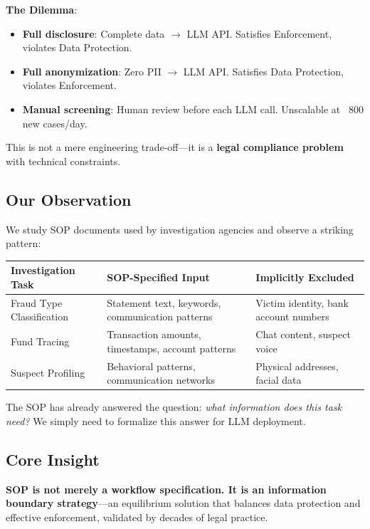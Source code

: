 \documentclass[letterpaper]{article}
\begin{document}
\textbf{The Dilemma}:
\begin{itemize}
    \item \textbf{Full disclosure}: Complete data $\rightarrow$ LLM API. Satisfies Enforcement, violates Data Protection.
    \item \textbf{Full anonymization}: Zero PII $\rightarrow$ LLM API. Satisfies Data Protection, violates Enforcement.
    \item \textbf{Manual screening}: Human review before each LLM call. Unscalable at ~800 new cases/day.
\end{itemize}

This is not a mere engineering trade-off---it is a \textbf{legal compliance problem} with technical constraints.

\subsection{Our Observation}

We study SOP documents used by investigation agencies and observe a striking pattern:

\begin{center}
\small
\begin{tabular}{@{}p{3cm}p{5cm}p{5cm}@{}}
\toprule
\textbf{Investigation Task} & \textbf{SOP-Specified Input} & \textbf{Implicitly Excluded} \\
\midrule
Fraud Type Classification & Statement text, keywords, communication patterns & Victim identity, bank account numbers \\
\midrule
Fund Tracing & Transaction amounts, timestamps, account patterns & Chat content, suspect voice \\
\midrule
Suspect Profiling & Behavioral patterns, communication networks & Physical addresses, facial data \\
\bottomrule
\end{tabular}
\end{center}

The SOP has already answered the question: \emph{what information does this task need?} We simply need to formalize this answer for LLM deployment.

\subsection{Core Insight}

\textbf{SOP is not merely a workflow specification. It is an information boundary strategy}---an equilibrium solution that balances data protection and effective enforcement, validated by decades of legal practice.
\end{document}
